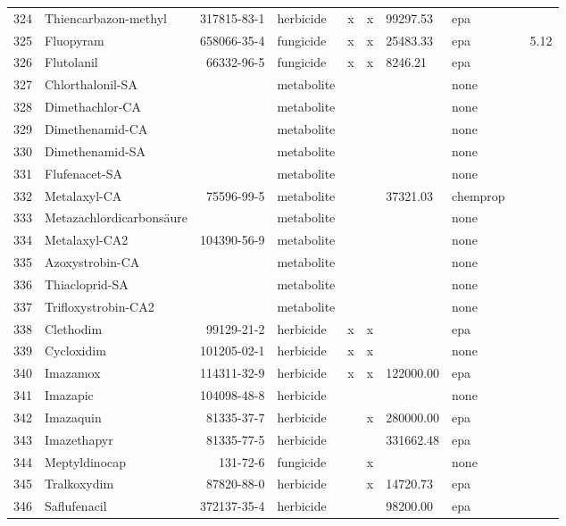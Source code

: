 \begin{longtable}{lp{3cm}rlp{0.5cm}p{0.5cm}p{1cm}p{1cm}p{1cm}p{1cm}}
  324 & Thiencarbazon-methyl & 317815-83-1 & herbicide & x & x & 99297.53 & epa &  &  \\ 
  325 & Fluopyram & 658066-35-4 & fungicide & x & x & 25483.33 & epa &  & 5.12 \\ 
  326 & Flutolanil & 66332-96-5 & fungicide & x & x & 8246.21 & epa &  &  \\ 
  327 & Chlorthalonil-SA &  & metabolite &  &  &  & none &  &  \\ 
  328 & Dimethachlor-CA &  & metabolite &  &  &  & none &  &  \\ 
  329 & Dimethenamid-CA &  & metabolite &  &  &  & none &  &  \\ 
  330 & Dimethenamid-SA &  & metabolite &  &  &  & none &  &  \\ 
  331 & Flufenacet-SA &  & metabolite &  &  &  & none &  &  \\ 
  332 & Metalaxyl-CA & 75596-99-5 & metabolite &  &  & 37321.03 & chemprop &  &  \\ 
  333 & Metazachlordicarbonsäure &  & metabolite &  &  &  & none &  &  \\ 
  334 & Metalaxyl-CA2 & 104390-56-9 & metabolite &  &  &  & none &  &  \\ 
  335 & Azoxystrobin-CA &  & metabolite &  &  &  & none &  &  \\ 
  336 & Thiacloprid-SA &  & metabolite &  &  &  & none &  &  \\ 
  337 & Trifloxystrobin-CA2 &  & metabolite &  &  &  & none &  &  \\ 
  338 & Clethodim & 99129-21-2 & herbicide & x & x &  & epa &  &  \\ 
  339 & Cycloxidim & 101205-02-1 & herbicide & x & x &  & none &  &  \\ 
  340 & Imazamox & 114311-32-9 & herbicide & x & x & 122000.00 & epa &  &  \\ 
  341 & Imazapic & 104098-48-8 & herbicide &  &  &  & none &  &  \\ 
  342 & Imazaquin & 81335-37-7 & herbicide &  & x & 280000.00 & epa &  &  \\ 
  343 & Imazethapyr & 81335-77-5 & herbicide &  &  & 331662.48 & epa &  &  \\ 
  344 & Meptyldinocap & 131-72-6 & fungicide &  & x &  & none &  &  \\ 
  345 & Tralkoxydim & 87820-88-0 & herbicide &  & x & 14720.73 & epa &  &  \\ 
  346 & Saflufenacil & 372137-35-4 & herbicide &  &  & 98200.00 & epa &  &  \\ 

\end{longtable}
